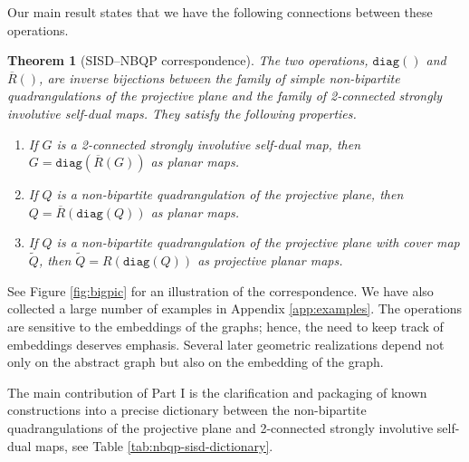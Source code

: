 \documentclass{article}
\newtheorem{theorem}{Theorem}[section]
\newcommand{\diag}[0]{\mathtt{diag}}
\begin{document}
Our main result states that we have the following connections between these operations.


\begin{theorem}[SISD--NBQP correspondence]\label{thm:commute} The two operations, $\diag()$ and $\overline R()$, are inverse bijections between the family of simple non-bipartite quadrangulations of the projective plane  and the family of 2-connected strongly involutive self-dual maps. They satisfy the following properties.  
\begin{enumerate}
    \item[a)] If $G$ is a 2-connected strongly involutive self-dual map, then $G=\diag(\overline R(G))$ as planar maps.
    \item[b)] If $Q$ is a non-bipartite quadrangulation of the projective plane, then $Q=\overline R(\diag(Q))$ as planar maps.
    \item[c)] If $Q$ is a non-bipartite quadrangulation of the projective plane with cover map $\widetilde Q$, then $\widetilde Q= R(\diag(Q))$ as projective planar maps.
\end{enumerate}
    \end{theorem}




 See Figure \ref{fig:bigpic} for an illustration of the correspondence. We have also collected a large number of examples in  Appendix \ref{app:examples}. The operations are sensitive to the embeddings of the graphs; hence, the need to keep track of embeddings deserves emphasis. Several later geometric realizations depend not only on the abstract graph but also on the embedding of the graph. 

The main contribution of Part I is the clarification and packaging of known constructions into a precise dictionary between the non-bipartite quadrangulations of the projective plane and 2-connected strongly involutive self-dual maps, see Table \ref{tab:nbqp-sisd-dictionary}.
\end{document}
